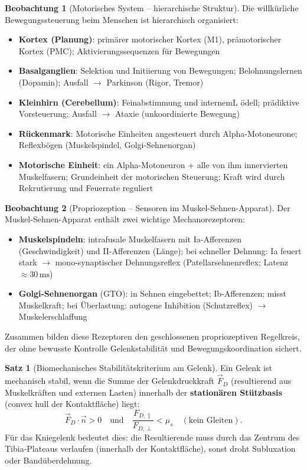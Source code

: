 ﻿\documentclass[a4paper,12pt]{report}
\theoremstyle{definition}
\newtheorem{satz}{Satz}
\newtheorem{beobachtung}{Beobachtung}
\begin{document}
\begin{beobachtung}[Motorisches System -- hierarchische Struktur]
Die willkürliche Bewegungssteuerung beim Menschen ist hierarchisch organisiert:
\begin{itemize}
    \item[-] \textbf{Kortex (Planung)}: primärer motorischer Kortex (M1),
          prämotorischer Kortex (PMC); Aktivierungssequenzen für Bewegungen
    \item[-] \textbf{Basalganglien}: Selektion und Initiierung von Bewegungen;
          Belohnungslernen (Dopamin); Ausfall $\to$ Parkinson (Rigor, Tremor)
    \item[-] \textbf{Kleinhirn (Cerebellum)}: Feinabstimmung und internemL ödell;
          prädiktive Vorsteuerung; Ausfall $\to$ Ataxie (unkoordinierte Bewegung)
    \item[-] \textbf{Rückenmark}: Motorische Einheiten angesteuert durch
          Alpha-Motoneurone; Reflexbögen (Muskelspindel, Golgi-Sehnenorgan)
    \item[-] \textbf{Motorische Einheit}: ein Alpha-Motoneuron + alle von ihm
          innervierten Muskelfasern; Grundeinheit der motorischen Steuerung;
          Kraft wird durch Rekrutierung und Feuerrate reguliert
\end{itemize}
\end{beobachtung}

\begin{beobachtung}[Propriozeption -- Sensoren im Muskel-Sehnen-Apparat]
Der Muskel-Sehnen-Apparat enthält zwei wichtige Mechanorezeptoren:
\begin{itemize}
    \item[-] \textbf{Muskelspindeln}: intrafusale Muskelfasern mit Ia-Afferenzen
          (Geschwindigkeit) und II-Afferenzen (Länge); bei schneller Dehnung:
          Ia feuert stark $\to$ mono-synaptischer Dehnungsreflex
          (Patellarsehnenreflex; Latenz $\approx 30\,\mathrm{ms}$)
    \item[-] \textbf{Golgi-Sehnenorgan} (GTO): in Sehnen eingebettet;
          Ib-Afferenzen; misst Muskelkraft; bei Überlastung:
          autogene Inhibition (Schutzreflex) $\to$ Muskelerschlaffung
\end{itemize}
Zusammen bilden diese Rezeptoren den geschlossenen propriozeptiven Regelkreis,
der ohne bewusste Kontrolle Gelenkstabilität und Bewegungskoordination sichert.
\end{beobachtung}

\begin{satz}[Biomechanisches Stabilitätskriterium am Gelenk]
Ein Gelenk ist mechanisch stabil, wenn die Summe der Gelenkdruckkraft $\vec{F}_D$
(resultierend aus Muskelkräften und externen Lasten) innerhalb der
\textbf{stationären Stützbasis} (convex hull der Kontaktfläche) liegt:
\[
  \vec{F}_D\cdot\vec{n} > 0 \quad \text{und} \quad
  \frac{F_{D,\parallel}}{F_{D,\perp}} < \mu_s
  \quad (\text{kein Gleiten}).
\]
Für das Kniegelenk bedeutet dies: die Resultierende muss durch das
Zentrum des Tibia-Plateaus verlaufen (innerhalb der Kontaktfläche),
sonst droht Subluxation oder Bandüberdehnung.
\end{satz}
\end{document}
